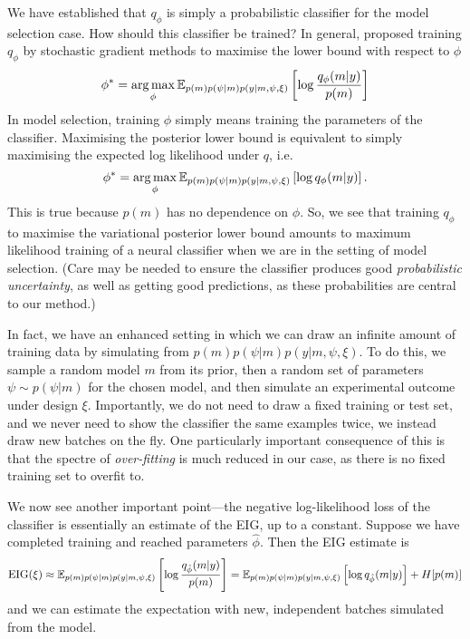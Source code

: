 \documentclass[a4paper, 10pt]{report}
\theoremstyle{plain}
\begin{document}
	We have established that $q_\phi$ is simply a probabilistic classifier for the model selection case.
	How should this classifier be trained? 
	In general, \citet{foster2019variational} proposed training $q_\phi$ by stochastic gradient methods \citep{robbins1951stochastic,kingma2014adam} to maximise the lower bound with respect to $\phi$
	\begin{equation}
	\phi^* = \operatorname*{arg\,max}_\phi \mathbb{E}_{p(m)p(\psi|m)p(y|m,\psi,\xi)}\left[ \log \frac{q_\phi(m|y)}{p(m)} \right]
	\end{equation}
	In model selection, training $\phi$ simply means training the parameters of the classifier. 
	Maximising the posterior lower bound is equivalent to simply maximising the expected log likelihood under $q$, i.e. 
	\begin{equation}
	\phi^* = \operatorname*{arg\,max}_\phi \mathbb{E}_{p(m)p(\psi|m)p(y|m,\psi,\xi)}\left[ \log q_\phi(m|y) \right].
	\end{equation}
	This is true because $p(m)$ has no dependence on $\phi$.
	So, we see that training $q_\phi$ to maximise the variational posterior lower bound amounts to maximum likelihood training of a neural classifier when we are in the setting of model selection.
	(Care may be needed to ensure the classifier produces good \emph{probabilistic uncertainty}, as well as getting good predictions, as these probabilities are central to our method.)
	
	In fact, we have an enhanced setting in which we can draw an infinite amount of training data by simulating from $p(m)p(\psi|m)p(y|m,\psi,\xi)$.
	To do this, we sample a random model $m$ from its prior, then a random set of parameters $\psi \sim p(\psi|m)$ for the chosen model, and then simulate an experimental outcome under design $\xi$.
	Importantly, we do not need to draw a fixed training or test set, and we never need to show the classifier the same examples twice, we instead draw new batches on the fly.
	One particularly important consequence of this is that the spectre of \emph{over-fitting} is much reduced in our case, as there is no fixed training set to overfit to.
	
	We now see another important point---the negative log-likelihood loss of the classifier is essentially an estimate of the EIG, up to a constant.
	Suppose we have completed training and reached parameters $\hat{\phi}$.
	Then the EIG estimate is
	\begin{equation}
	\text{EIG}(\xi) \approx \mathbb{E}_{p(m)p(\psi|m)p(y|m,\psi,\xi)}\left[ \log \frac{q_{\hat{\phi}}(m|y)}{p(m)} \right] = \mathbb{E}_{p(m)p(\psi|m)p(y|m,\psi,\xi)}\left[ \log q_{\hat{\phi}}(m|y) \right] + H[p(m)]
	\end{equation}
	and we can estimate the expectation with new, independent batches simulated from the model.
	
\end{document}
